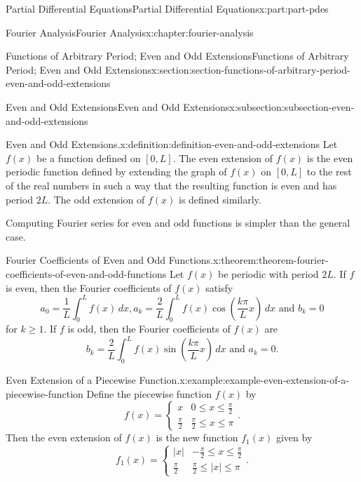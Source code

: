 \documentclass[oneside,10pt,]{book}
\numberwithin{equation}{part}
\newcommand{\amp}{&}
\begin{document}
\begin{partptx}{Partial Differential Equations}{}{Partial Differential Equations}{}{}{x:part:part-pdes}
\begin{chapterptx}{Fourier Analysis}{}{Fourier Analysis}{}{}{x:chapter:fourier-analysis}
\begin{sectionptx}{Functions of Arbitrary Period; Even and Odd Extensions}{}{Functions of Arbitrary Period; Even and Odd Extensions}{}{}{x:section:section-functions-of-arbitrary-period-even-and-odd-extensions}
\begin{subsectionptx}{Even and Odd Extensions}{}{Even and Odd Extensions}{}{}{x:subsection:subsection-even-and-odd-extensions}
\begin{definition}{Even and Odd Extensions.}{x:definition:definition-even-and-odd-extensions}
%
Let \(f(x)\) be a function defined on \([0,L]\). The even extension of \(f(x)\) is the even periodic function defined by extending the graph of \(f(x)\) on \([0,L]\) to the rest of the real numbers in such a way that the resulting function is even and has period \(2L\). The odd extension of \(f(x)\) is defined similarly.%
\end{definition}
Computing Fourier series for even and odd functions is simpler than the general case.%
\begin{theorem}{Fourier Coefficients of Even and Odd Functions.}{}{x:theorem:theorem-fourier-coefficients-of-even-and-odd-functions}%
%
Let \(f(x)\) be periodic with period \(2L\). If \(f\) is even, then the Fourier coefficients of \(f(x)\) satisfy%
\begin{equation*}
a_{0} = \frac{1}{L}\int_{0}^{L}f(x)\,dx, a_{k} = \frac{2}{L}\int_{0}^{L}f(x)\cos\left(\frac{k\pi}{L}x\right)\,dx\text{ and } b_{k} = 0
\end{equation*}
for \(k\geq1\). If \(f\) is odd, then the Fourier coefficients of \(f(x)\) are%
\begin{equation*}
b_{k} = \frac{2}{L}\int_{0}^{L}f(x)\sin\left(\frac{k\pi}{L}x\right)\,dx\text{ and } a_{k} = 0.
\end{equation*}
%
\end{theorem}
\begin{example}{Even Extension of a Piecewise Function.}{x:example:example-even-extension-of-a-piecewise-function}%
Define the piecewise function \(f(x)\) by%
\begin{equation*}
f(x) = \begin{cases}x \amp 0\leq x\leq \frac{\pi}{2} \\ \frac{\pi}{2} \amp \frac{\pi}{2}\leq x\leq \pi\end{cases}.
\end{equation*}
Then the even extension of \(f(x)\) is the new function \(f_{1}(x)\) given by%
\begin{equation*}
f_{1}(x) = \begin{cases}|x| \amp -\frac{\pi}{2}\leq x\leq \frac{\pi}{2} \\ \frac{\pi}{2} \amp \frac{\pi}{2}\leq |x|\leq \pi\end{cases}.
\end{equation*}

\end{example}
\end{subsectionptx}
\end{sectionptx}
\end{chapterptx}
\end{partptx}
\end{document}
